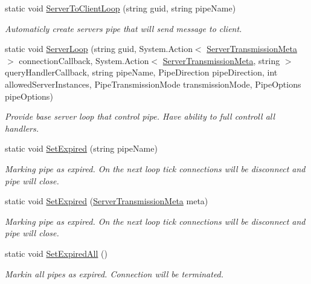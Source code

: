 \begin{DoxyCompactItemize}
static void \mbox{\hyperlink{class_pipes_provider_1_1_a_p_i_ae24aa9b5d3220b373d5689bddc22e924}{Server\+To\+Client\+Loop}} (string guid, string pipe\+Name)
\begin{DoxyCompactList}\small\item\em Automaticly create server\textquotesingle{}s pipe that will send message to client. \end{DoxyCompactList}\item 
static void \mbox{\hyperlink{class_pipes_provider_1_1_a_p_i_ab18891bb1d9c04a9c9144e0d8c89aebf}{Server\+Loop}} (string guid, System.\+Action$<$ \mbox{\hyperlink{class_pipes_provider_1_1_server_transmission_meta}{Server\+Transmission\+Meta}} $>$ connection\+Callback, System.\+Action$<$ \mbox{\hyperlink{class_pipes_provider_1_1_server_transmission_meta}{Server\+Transmission\+Meta}}, string $>$ query\+Handler\+Callback, string pipe\+Name, Pipe\+Direction pipe\+Direction, int allowed\+Server\+Instances, Pipe\+Transmission\+Mode transmission\+Mode, Pipe\+Options pipe\+Options)
\begin{DoxyCompactList}\small\item\em Provide base server loop that control pipe. Have ability to full controll all handlers. \end{DoxyCompactList}\item 
static void \mbox{\hyperlink{class_pipes_provider_1_1_a_p_i_ab525aaa0c87f23cfbe4ad6d0ed1b1b4c}{Set\+Expired}} (string pipe\+Name)
\begin{DoxyCompactList}\small\item\em Marking pipe as expired. On the next loop tick connections will be disconnect and pipe will close. \end{DoxyCompactList}\item 
static void \mbox{\hyperlink{class_pipes_provider_1_1_a_p_i_a9bfed3a9b5733c6a76235ec096c903e3}{Set\+Expired}} (\mbox{\hyperlink{class_pipes_provider_1_1_server_transmission_meta}{Server\+Transmission\+Meta}} meta)
\begin{DoxyCompactList}\small\item\em Marking pipe as expired. On the next loop tick connections will be disconnect and pipe will close. \end{DoxyCompactList}\item 
static void \mbox{\hyperlink{class_pipes_provider_1_1_a_p_i_a7e26cdf7c5b1f43abd155b4988f7bab1}{Set\+Expired\+All}} ()
\begin{DoxyCompactList}\small\item\em Markin all pipes as expired. Connection will be terminated. \end{DoxyCompactList}\item 

\end{DoxyCompactItemize}
